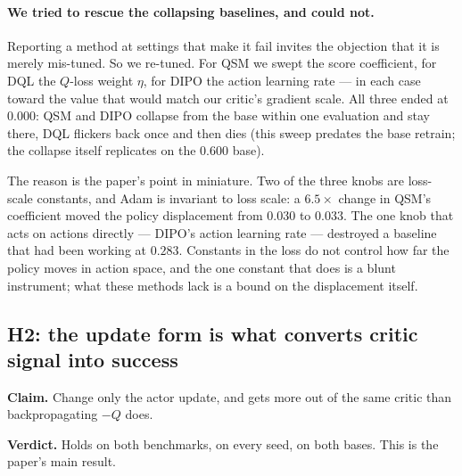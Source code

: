 \paragraph{We tried to rescue the collapsing baselines, and could not.}
\label{sec:exp-retune}
Reporting a method at settings that make it fail invites the objection that
it is merely mis-tuned. So we re-tuned. For QSM we swept the score
coefficient, for DQL the $Q$-loss weight $\eta$, for DIPO the action
learning rate --- in each case toward the value that would match our
critic's gradient scale. All three ended at $0.000$: QSM and DIPO collapse
from the base within one evaluation and stay there, DQL flickers
back once and then dies (this sweep predates the base retrain; the collapse
itself replicates on the $0.600$ base).

The reason is the paper's point in miniature. Two of the three knobs are
loss-scale constants, and Adam is invariant to loss scale: a $6.5\times$
change in QSM's coefficient moved the policy displacement from $0.030$ to
$0.033$. The one knob that acts on actions directly --- DIPO's action
learning rate --- destroyed a baseline that had been working at $0.283$.
Constants in the loss do not control how far the policy moves in action
space, and the one constant that does is a blunt instrument; what these
methods lack is a bound on the displacement itself.

\subsection{H2: the update form is what converts critic signal into success}
\label{sec:exp-form}

\textbf{Claim.} Change only the actor update, and \method{} gets more out of
the same critic than backpropagating $-Q$ does.

\textbf{Verdict.} Holds on both benchmarks, on every seed, on both bases.
This is the paper's main result.

